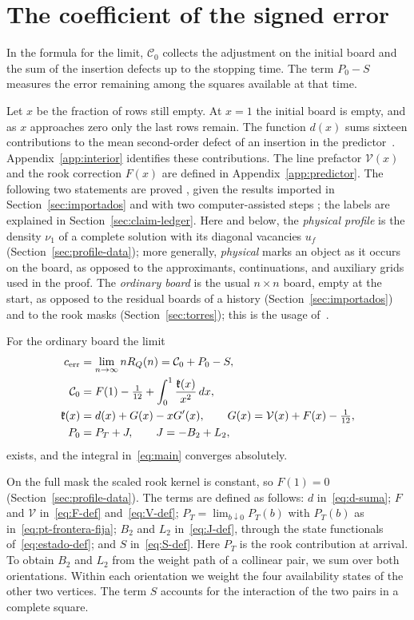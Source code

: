 \section{The coefficient of the signed error}\label{sec:principal}
In the formula for the limit, $\mathcal C_0$ collects the adjustment on the initial board and the sum of
the insertion defects up to the stopping time. The term $P_0-S$ measures the error remaining among the
squares available at that time.

Let $x$ be the fraction of rows still empty. At $x=1$ the initial board is empty, and as $x$ approaches
zero only the last rows remain. The function $d(x)$ sums sixteen contributions to the mean second-order
defect of an insertion in the predictor~\cite{pc}. Appendix~\ref{app:interior} identifies these
contributions. The line prefactor $\mathcal V(x)$ and the rook correction $F(x)$ are defined in
Appendix~\ref{app:predictor}. The following two statements are proved , given the results
imported in Section~\ref{sec:importados} and with two computer-assisted steps ; the labels
are explained in Section~\ref{sec:claim-ledger}. Here and below, the \emph{physical profile} is the
density $\nu_1$ of a complete solution with its diagonal vacancies $u_f$
(Section~\ref{sec:profile-data}); more generally, \emph{physical} marks an object as it occurs on the
board, as opposed to the approximants, continuations, and auxiliary grids used in the proof. The
\emph{ordinary board} is the usual $n\times n$ board, empty at the start, as opposed to the residual
boards of a history (Section~\ref{sec:importados}) and to the rook masks (Section~\ref{sec:torres});
this is the usage of~\cite{pc,tc}.

\begin{teorema}\label{teo:principal}
For the ordinary board the limit
\begin{align}
 c_{\mathrm{err}}&=\lim_{n\to\infty}nR_Q(n)=\mathcal C_0+P_0-S,\label{eq:main}\\
 \mathcal C_0&=F(1)-\tfrac1{12}+\int_0^1 \frac{\mathfrak{k}(x)}{x^2}\,dx,\notag\\
 \mathfrak{k}(x)&=d(x)+G(x)-xG'(x),\qquad G(x)=\mathcal V(x)+F(x)-\tfrac1{12},\notag\\
 P_0&=P_T+J,\qquad J=-B_2+L_2,\notag
\end{align}
exists, and the integral in~\eqref{eq:main} converges absolutely.
\end{teorema}
On the full mask the scaled rook kernel is constant, so \(F(1)=0\) (Section~\ref{sec:profile-data}). The
terms are defined as follows: $d$ in~\eqref{eq:d-suma}; $F$ and $\mathcal V$ in~\eqref{eq:F-def}
and~\eqref{eq:V-def}; $P_T=\lim_{b\downarrow0}P_T(b)$ with $P_T(b)$ as
in~\eqref{eq:pt-frontera-fija}; $B_2$ and $L_2$ in~\eqref{eq:J-def}, through the state functionals
of~\eqref{eq:estado-def}; and $S$ in~\eqref{eq:S-def}. Here
$P_T$ is the rook contribution at arrival. To obtain $B_2$ and $L_2$ from the weight path of a collinear
pair, we sum over both orientations. Within each orientation we weight the four availability states of
the other two vertices. The term $S$ accounts for the interaction of the two pairs in a complete square.

